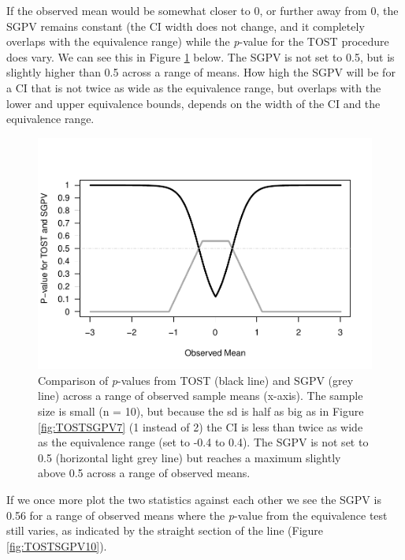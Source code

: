 \documentclass[,man,floatsintext]{apa6}
\begin{document}
If the observed mean would be somewhat closer to 0, or further away from 0, the SGPV remains constant (the CI width does not change, and it completely overlaps with the equivalence range) while the \emph{p}-value for the TOST procedure does vary. We can see this in Figure \ref{fig:TOSTSGPV9} below. The SGPV is not set to 0.5, but is slightly higher than 0.5 across a range of means. How high the SGPV will be for a CI that is not twice as wide as the equivalence range, but overlaps with the lower and upper equivalence bounds, depends on the width of the CI and the equivalence range.

\begin{figure}
\centering
\includegraphics{manuscript.R2_files/figure-latex/TOSTSGPV9-1.pdf}
\caption{\label{fig:TOSTSGPV9}Comparison of \emph{p}-values from TOST (black line) and SGPV (grey line) across a range of observed sample means (x-axis). The sample size is small (n = 10), but because the sd is half as big as in Figure \ref{fig:TOSTSGPV7} (1 instead of 2) the CI is less than twice as wide as the equivalence range (set to -0.4 to 0.4). The SGPV is not set to 0.5 (horizontal light grey line) but reaches a maximum slightly above 0.5 across a range of observed means.}
\end{figure}

If we once more plot the two statistics against each other we see the SGPV is 0.56 for a range of observed means where the \emph{p}-value from the equivalence test still varies, as indicated by the straight section of the line (Figure \ref{fig:TOSTSGPV10}).
\end{document}
